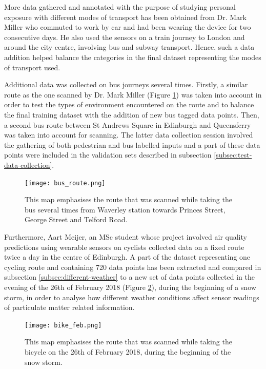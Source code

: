 \documentclass[bsc,frontabs,twoside,singlespacing, parskip,deptreport]{infthesis}     %
\begin{document}
More data gathered and annotated with the purpose of studying personal exposure with different modes of transport has been obtained from Dr. Mark Miller who commuted to work by car and had been wearing the device for two consecutive days. He also used the sensors on a train journey to London and around the city centre, involving bus and subway transport. Hence, such a data addition helped balance the categories in the final dataset representing the modes of transport used.

Additional data was collected on bus journeys several times. Firstly, a similar route as the one scanned by Dr. Mark Miller (Figure \ref{fig:bus_route}) was taken into account in order to test the types of environment encountered on the route and to balance the final training dataset with the addition of new bus tagged data points. Then, a second bus route between St Andrews Square in Edinburgh and Queensferry was taken into account for scanning. The latter data collection session involved the gathering of both pedestrian and bus labelled inputs and a part of these data points were included in the validation sets described in subsection \ref{subsec:test-data-collection}.

\begin{figure}[h!]
  \center
  \texttt{[image: bus\_route.png]} 
  \caption{This map emphasises the route that was scanned while taking the bus several times from Waverley station towards Princes Street, George Street and Telford Road.}
  \label{fig:bus_route}
\end{figure}

Furthermore, Aart Meijer, an MSc student whose project involved air quality predictions using wearable sensors on cyclists \cite{Meijer2015} collected data on a fixed route twice a day in the centre of Edinburgh. A part of the dataset representing one cycling route and containing 720 data points has been extracted and compared in subsection \ref{subsec:different-weather} to a new set of data points collected in the evening of the 26th of February 2018 (Figure \ref{fig:february-bike}), during the beginning of a snow storm, in order to analyse how different weather conditions affect sensor readings of particulate matter related information.

\begin{figure}[h!]
  \center
  \texttt{[image: bike\_feb.png]} 
  \caption{This map emphasises the route that was scanned while taking the bicycle on the 26th of February 2018, during the beginning of the snow storm.}
  \label{fig:february-bike}
\end{figure}
\end{document}
